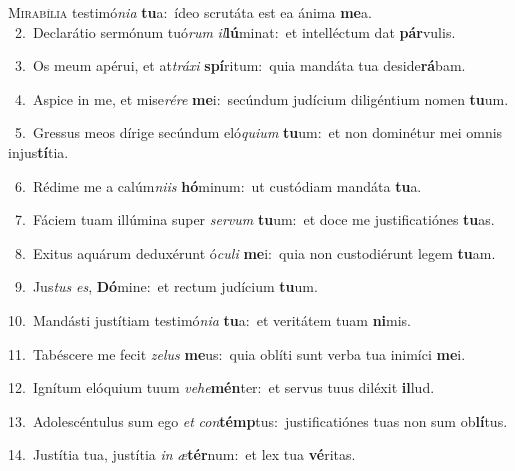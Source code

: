 \lettrine{\initial\textcolor{\initialcolor}{M}}{irabília} testimó\-\textit{ni}\-\textit{a} \textbf{tu}\-a:~\star ídeo scrutáta est ea ánima \textbf{me}\-a.\\
{\numbfont\textcolor{\numbcolor}{~2.}}~Declarátio sermónum tuó\textit{rum} \textit{il}\-\textbf{lú}minat:~\star et intelléctum dat \textbf{pár}\-vulis.\par
{\numbfont\textcolor{\numbcolor}{~3.}}~Os meum apérui, et at\-\textit{trá}\-\textit{xi} \textbf{spí}\-ritum:~\star quia mandáta tua deside\-\textbf{rá}\-bam.\par
{\numbfont\textcolor{\numbcolor}{~4.}}~Aspice in me, et mise\-\textit{ré}\-\textit{re} \textbf{me}\-i:~\star secúndum judícium diligéntium nomen \textbf{tu}\-um.\par
{\numbfont\textcolor{\numbcolor}{~5.}}~Gressus meos dírige secúndum eló\-\textit{qui}\-\textit{um} \textbf{tu}\-um:~\star et non dominétur mei omnis injus\-\textbf{tí}\-tia.\par
{\numbfont\textcolor{\numbcolor}{~6.}}~Rédime me a calúm\-\textit{ni}\-\textit{is} \textbf{hó}\-minum:~\star ut custódiam mandáta \textbf{tu}\-a.\par
{\numbfont\textcolor{\numbcolor}{~7.}}~Fáciem tuam illúmina super \textit{ser}\-\textit{vum} \textbf{tu}\-um:~\star et doce me justificatiónes \textbf{tu}\-as.\par
{\numbfont\textcolor{\numbcolor}{~8.}}~Exitus aquárum deduxérunt ó\-\textit{cu}\-\textit{li} \textbf{me}\-i:~\star quia non custodiérunt legem \textbf{tu}\-am.\par
{\numbfont\textcolor{\numbcolor}{~9.}}~Jus\textit{tus} \textit{es}\-, \textbf{Dó}\-mine:~\star et rectum judícium \textbf{tu}\-um.\par
{\numbfont\textcolor{\numbcolor}{10.}}~Mandásti justítiam testimó\-\textit{ni}\-\textit{a} \textbf{tu}\-a:~\star et veritátem tuam \textbf{ni}\-mis.\par
{\numbfont\textcolor{\numbcolor}{11.}}~Tabéscere me fecit \textit{ze}\-\textit{lus} \textbf{me}\-us:~\star quia oblíti sunt verba tua inimíci \textbf{me}\-i.\par
{\numbfont\textcolor{\numbcolor}{12.}}~Ignítum elóquium tuum \textit{ve}\-\textit{he}\textbf{mén}ter:~\star et servus tuus diléxit \textbf{il}\-lud.\par
{\numbfont\textcolor{\numbcolor}{13.}}~Adolescéntulus sum ego \textit{et} \textit{con}\-\textbf{témp}tus:~\star justificatiónes tuas non sum ob\-\textbf{lí}\-tus.\par
{\numbfont\textcolor{\numbcolor}{14.}}~Justítia tua, justítia \textit{in} \textit{æ}\-\textbf{tér}num:~\star et lex tua \textbf{vé}\-ritas.\par
